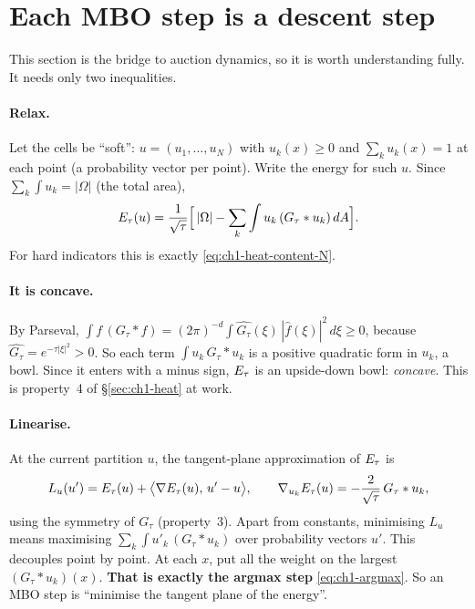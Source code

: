 \section{Each MBO step is a descent step}
\label{sec:ch1-descent}

This section is the bridge to auction dynamics, so it is worth understanding
fully. It needs only two inequalities.

\paragraph{Relax.}
Let the cells be ``soft'': $u = (u_1, \dots, u_N)$ with $u_k(x) \ge 0$ and
$\sum_k u_k(x) = 1$ at each point (a probability vector per point). Write the
energy for such $u$. Since $\sum_k \int u_k = |\Omega|$ (the total area),
\begin{equation}
  E_\tau(u) = \frac{1}{\sqrt\tau}\Bigl[\,|\Omega| - \sum_k \int u_k\, (G_\tau * u_k)\,dA\Bigr].
  \label{eq:ch1-relaxed}
\end{equation}
For hard indicators this is exactly \eqref{eq:ch1-heat-content-N}.

\paragraph{It is concave.}
By Parseval, $\int f\,(G_\tau * f) = (2\pi)^{-d}\int \widehat{G_\tau}(\xi)\,
|\hat f(\xi)|^2\, d\xi \ge 0$, because $\widehat{G_\tau} = e^{-\tau|\xi|^2} > 0$.
So each term $\int u_k\, G_\tau * u_k$ is a positive quadratic form in $u_k$, a
bowl. Since it enters with a minus sign, $E_\tau$ is an upside-down bowl:
\emph{concave}. This is property~4 of \S\ref{sec:ch1-heat} at work.

\paragraph{Linearise.}
At the current partition $u$, the tangent-plane approximation of $E_\tau$ is
\[
  L_u(u') = E_\tau(u) + \bigl\langle \nabla E_\tau(u),\, u' - u \bigr\rangle,
  \qquad \nabla_{u_k} E_\tau(u) = -\frac{2}{\sqrt\tau}\, G_\tau * u_k ,
\]
using the symmetry of $G_\tau$ (property~3). Apart from constants, minimising
$L_u$ means maximising $\sum_k \int u'_k\, (G_\tau * u_k)$ over probability
vectors $u'$. This decouples point by point. At each $x$, put all the weight
on the largest $(G_\tau * u_k)(x)$. \textbf{That is exactly the argmax step}
\eqref{eq:ch1-argmax}. So an MBO step is ``minimise the tangent plane of the
energy''.

